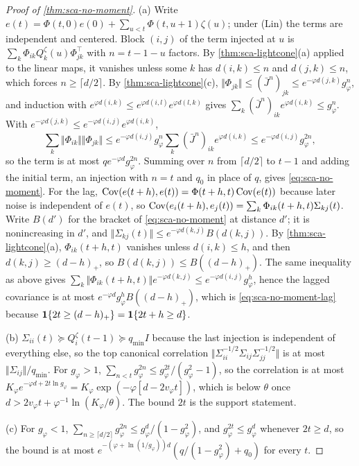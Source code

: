 \begin{proof}[Proof of \cref{thm:sca-no-moment}]
(a) Write $e(t)=\Phi(t,0)e(0)+\sum_{u<t}\Phi(t,u+1)\zeta(u)$; under \textup{(Lin)} the terms are independent and centered. Block $(i,j)$ of the term injected at $u$ is $\sum_k\Phi_{ik}Q^\zeta_k(u)\Phi_{jk}^\top$ with $n=t-1-u$ factors. By \cref{thm:sca-lightcone}(a) applied to the linear maps, it vanishes unless some $k$ has $d(i,k)\le n$ and $d(j,k)\le n$, which forces $n\ge\lceil d/2\rceil$. By \cref{thm:sca-lightcone}(c), $\Vert\Phi_{jk}\Vert\le(\bar J^n)_{jk}\le e^{-\varphi d(j,k)}g_\varphi^n$, and induction with $e^{\varphi d(i,k)}\le e^{\varphi d(i,l)}e^{\varphi d(l,k)}$ gives $\sum_k(\bar J^n)_{ik}e^{\varphi d(i,k)}\le g_\varphi^n$. With $e^{-\varphi d(j,k)}\le e^{-\varphi d(i,j)}e^{\varphi d(i,k)}$,
\begin{equation*}
\sum_k\Vert\Phi_{ik}\Vert\Vert\Phi_{jk}\Vert\le e^{-\varphi d(i,j)}g_\varphi^n\sum_k(\bar J^n)_{ik}e^{\varphi d(i,k)}\le e^{-\varphi d(i,j)}g_\varphi^{2n},
\end{equation*}
so the term is at most $qe^{-\varphi d}g_\varphi^{2n}$. Summing over $n$ from $\lceil d/2\rceil$ to $t-1$ and adding the initial term, an injection with $n=t$ and $q_0$ in place of $q$, gives \eqref{eq:sca-no-moment}. For the lag, $\operatorname{Cov}(e(t+h),e(t))=\Phi(t+h,t)\operatorname{Cov}(e(t))$ because later noise is independent of $e(t)$, so $\operatorname{Cov}(e_i(t+h),e_j(t))=\sum_k\Phi_{ik}(t+h,t)\Sigma_{kj}(t)$. Write $B(d')$ for the bracket of \eqref{eq:sca-no-moment} at distance $d'$; it is nonincreasing in $d'$, and $\Vert\Sigma_{kj}(t)\Vert\le e^{-\varphi d(k,j)}B(d(k,j))$. By \cref{thm:sca-lightcone}(a), $\Phi_{ik}(t+h,t)$ vanishes unless $d(i,k)\le h$, and then $d(k,j)\ge(d-h)_+$, so $B(d(k,j))\le B((d-h)_+)$. The same inequality as above gives $\sum_k\Vert\Phi_{ik}(t+h,t)\Vert e^{-\varphi d(k,j)}\le e^{-\varphi d(i,j)}g_\varphi^h$, hence the lagged covariance is at most $e^{-\varphi d}g_\varphi^hB((d-h)_+)$, which is \eqref{eq:sca-no-moment-lag} because $\mathbf{1}\{2t\ge(d-h)_+\}=\mathbf{1}\{2t+h\ge d\}$.

(b) $\Sigma_{ii}(t)\succeq Q^\zeta_i(t-1)\succeq q_{\min}I$ because the last injection is independent of everything else, so the top canonical correlation $\Vert\Sigma_{ii}^{-1/2}\Sigma_{ij}\Sigma_{jj}^{-1/2}\Vert$ is at most $\Vert\Sigma_{ij}\Vert/q_{\min}$. For $g_\varphi>1$, $\sum_{n<t}g_\varphi^{2n}\le g_\varphi^{2t}/(g_\varphi^2-1)$, so the correlation is at most $K_\varphi e^{-\varphi d+2t\ln g_\varphi}=K_\varphi\exp(-\varphi[d-2v_\varphi t])$, which is below $\theta$ once $d>2v_\varphi t+\varphi^{-1}\ln(K_\varphi/\theta)$. The bound $2t$ is the support statement.

(c) For $g_\varphi<1$, $\sum_{n\ge\lceil d/2\rceil}g_\varphi^{2n}\le g_\varphi^d/(1-g_\varphi^2)$, and $g_\varphi^{2t}\le g_\varphi^d$ whenever $2t\ge d$, so the bound is at most $e^{-(\varphi+\ln(1/g_\varphi))d}(q/(1-g_\varphi^2)+q_0)$ for every $t$.
\end{proof}

